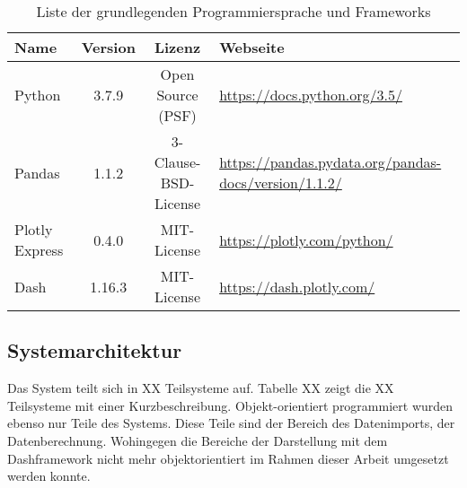     \begingroup
        \setlength{\tabcolsep}{4pt} %
        \renewcommand{\arraystretch}{1.5}
        \begin{table}[h]
            \centering
            \begin{adjustbox}{max width=\textwidth}
            \Huge
            \begin{tabular}{lccl}
               \toprule
               \textbf{Name}             &{Version}    &\textbf{Lizenz}                        & \textbf{Webseite}\\
               \midrule     
                    Python               &3.7.9         &Open Source (PSF)                     & \url{https://docs.python.org/3.5/}\\
                    Pandas               &1.1.2         &3-Clause-BSD-License                  & \url{https://pandas.pydata.org/pandas-docs/version/1.1.2/}\\
                    Plotly Express       &0.4.0         &MIT-License                           & \url{https://plotly.com/python/}\\
                    Dash                 &1.16.3        &MIT-License                           & \url{https://dash.plotly.com/}\\


                \bottomrule
            \end{tabular}
            \end{adjustbox}
            \caption{%
                Liste der grundlegenden Programmiersprache und Frameworks
            \label{tab:Software-Requirements}
            }
             \end{table}
        \endgroup
    
     
    \subsection{Systemarchitektur}
    
    Das System teilt sich in XX Teilsysteme auf. Tabelle XX zeigt die XX Teilsysteme mit einer Kurzbeschreibung.
    Objekt-orientiert programmiert wurden ebenso nur Teile des Systems. Diese Teile sind der Bereich des Datenimports, der Datenberechnung. Wohingegen die Bereiche der            
    Darstellung mit dem Dashframework nicht mehr objektorientiert im Rahmen dieser Arbeit umgesetzt werden konnte.
    

